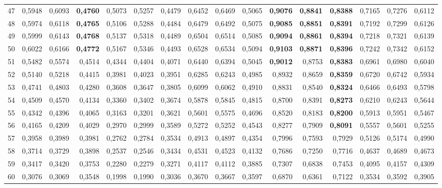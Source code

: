 \begin{table}[htp!]
\begin{adjustwidth}{-2cm}{}
\begin{tabular}{ l | *{15}{| r}}
47	&	0,5948	&	0,6093	&	\textbf{0,4760}	&	0,5073	&	0,5257	&	0,4479	&	0,6452	&	0,6469	&	0,5065	&	\textbf{0,9076}	&	\textbf{0,8841}	&	\textbf{0,8388}	&	0,7165	&	0,7276	&	0,6112	\\
48	&	0,5974	&	0,6118	&	\textbf{0,4765}	&	0,5106	&	0,5288	&	0,4484	&	0,6479	&	0,6492	&	0,5075	&	\textbf{0,9085}	&	\textbf{0,8851}	&	\textbf{0,8391}	&	0,7192	&	0,7299	&	0,6126	\\
49	&	0,5999	&	0,6143	&	\textbf{0,4768}	&	0,5137	&	0,5318	&	0,4489	&	0,6504	&	0,6514	&	0,5085	&	\textbf{0,9094}	&	\textbf{0,8861}	&	\textbf{0,8394}	&	0,7218	&	0,7321	&	0,6139	\\
50	&	0,6022	&	0,6166	&	\textbf{0,4772}	&	0,5167	&	0,5346	&	0,4493	&	0,6528	&	0,6534	&	0,5094	&	\textbf{0,9103}	&	\textbf{0,8871}	&	\textbf{0,8396}	&	0,7242	&	0,7342	&	0,6152	\\
51	&	0,5482	&	0,5574	&	0,4514	&	0,4344	&	0,4404	&	0,4071	&	0,6440	&	0,6394	&	0,5045	&	\textbf{0,9012}	&	0,8753	&	\textbf{0,8383}	&	0,6961	&	0,6980	&	0,6040	\\
52	&	0,5140	&	0,5218	&	0,4415	&	0,3981	&	0,4023	&	0,3951	&	0,6285	&	0,6243	&	0,4985	&	0,8932	&	0,8659	&	\textbf{0,8359}	&	0,6720	&	0,6742	&	0,5934	\\
53	&	0,4741	&	0,4803	&	0,4280	&	0,3608	&	0,3647	&	0,3805	&	0,6099	&	0,6062	&	0,4910	&	0,8831	&	0,8540	&	\textbf{0,8324}	&	0,6466	&	0,6493	&	0,5798	\\
54	&	0,4509	&	0,4570	&	0,4134	&	0,3360	&	0,3402	&	0,3674	&	0,5878	&	0,5845	&	0,4815	&	0,8700	&	0,8391	&	\textbf{0,8273}	&	0,6210	&	0,6243	&	0,5644	\\
55	&	0,4342	&	0,4396	&	0,4065	&	0,3163	&	0,3201	&	0,3621	&	0,5601	&	0,5575	&	0,4696	&	0,8520	&	0,8183	&	\textbf{0,8200}	&	0,5913	&	0,5951	&	0,5467	\\
56	&	0,4165	&	0,4209	&	0,4029	&	0,2970	&	0,2999	&	0,3589	&	0,5272	&	0,5252	&	0,4543	&	0,8277	&	0,7909	&	\textbf{0,8091}	&	0,5557	&	0,5601	&	0,5255	\\
57	&	0,3958	&	0,3989	&	0,3981	&	0,2762	&	0,2784	&	0,3534	&	0,4913	&	0,4897	&	0,4354	&	0,7996	&	0,7593	&	0,7929	&	0,5126	&	0,5174	&	0,4990	\\
58	&	0,3714	&	0,3729	&	0,3898	&	0,2537	&	0,2546	&	0,3434	&	0,4531	&	0,4523	&	0,4132	&	0,7686	&	0,7250	&	0,7716	&	0,4637	&	0,4689	&	0,4673	\\
59	&	0,3417	&	0,3420	&	0,3753	&	0,2280	&	0,2279	&	0,3271	&	0,4117	&	0,4112	&	0,3885	&	0,7307	&	0,6838	&	0,7453	&	0,4095	&	0,4157	&	0,4309	\\
60	&	0,3076	&	0,3069	&	0,3548	&	0,1998	&	0,1990	&	0,3036	&	0,3670	&	0,3667	&	0,3597	&	0,6870	&	0,6361	&	0,7122	&	0,3534	&	0,3592	&	0,3905	\\

\end{tabular}
\end{adjustwidth}
\end{table}
